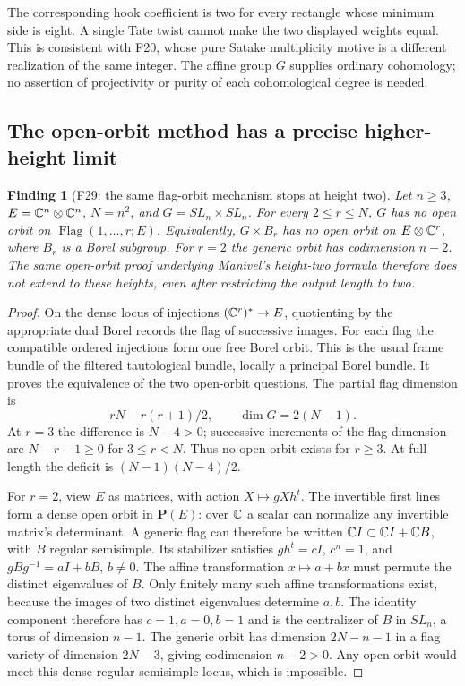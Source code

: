 \documentclass[11pt,a4paper]{article}
\newcommand{\fid}[1]{\textsf{#1}}\newcommand{\gate}[1]{\textsf{#1}}
\theoremstyle{named}\newtheorem{finding}{Finding}[section]
\theoremstyle{definition}\newtheorem{definition}[finding]{Definition}
\theoremstyle{remark}\newtheorem{remark}[finding]{Remark}
\begin{document}
The corresponding hook coefficient is two for every rectangle
whose minimum side is eight. A single Tate twist cannot make the
two displayed weights equal. This is consistent with \fid{F20},
whose pure Satake multiplicity motive is a different realization
of the same integer. The affine group $G$ supplies ordinary
cohomology; no assertion of projectivity or purity of each
cohomological degree is needed.


\subsection{The open-orbit method has a precise higher-height limit}
\begin{finding}[\fid{F29}: the same flag-orbit mechanism stops at height two]\label{f:sphericity}
Let $n\ge3$, $E=\mathbb C^n\otimes\mathbb C^n$, $N=n^2$, and
$G=SL_n\times SL_n$. For every $2\le r\le N$, $G$ has no
open orbit on $\operatorname{Flag}(1,\ldots,r;E)$.
Equivalently, $G\times B_r$ has no open orbit on $E\otimes\mathbb C^r$,
where $B_r$ is a Borel subgroup. For $r=2$ the generic orbit has
codimension $n-2$. The same open-orbit proof underlying Manivel's
height-two formula therefore does not extend to these heights,
even after restricting the output length to two.
\end{finding}
\begin{proof}
On the dense locus of injections $(\mathbb C^r)^*\to E$, quotienting
by the appropriate dual Borel records the flag of successive images.
For each flag the compatible ordered injections form one free Borel
orbit. This is the usual frame bundle of the filtered tautological
bundle, locally a principal Borel bundle. It proves the equivalence
of the two open-orbit questions. The partial flag dimension is
\[
 rN-r(r+1)/2,\qquad \dim G=2(N-1).
\]
At $r=3$ the difference is $N-4>0$; successive increments of the
flag dimension are $N-r-1\ge0$ for $3\le r<N$. Thus no open
orbit exists for $r\ge3$. At full length the deficit is
$(N-1)(N-4)/2$.

For $r=2$, view $E$ as matrices, with action $X\mapsto gXh^t$.
The invertible first lines form a dense open orbit in $\mathbf P(E)$:
over $\mathbb C$ a scalar can normalize any invertible matrix's determinant.
A generic flag can therefore be written
$\mathbb C I\subset\mathbb C I+\mathbb C B$, with $B$ regular semisimple.
Its stabilizer satisfies $gh^t=cI$, $c^n=1$, and
$gBg^{-1}=aI+bB$, $b\ne0$. The affine transformation
$x\mapsto a+bx$ must permute the distinct eigenvalues of $B$.
Only finitely many such affine transformations exist, because the
images of two distinct eigenvalues determine $a,b$. The identity
component therefore has $c=1,a=0,b=1$ and is the centralizer of
$B$ in $SL_n$, a torus of dimension $n-1$. The generic orbit has
dimension $2N-n-1$ in a flag variety of dimension $2N-3$,
giving codimension $n-2>0$. Any open orbit would meet this dense
regular-semisimple locus, which is impossible.
\end{proof}
\end{document}
